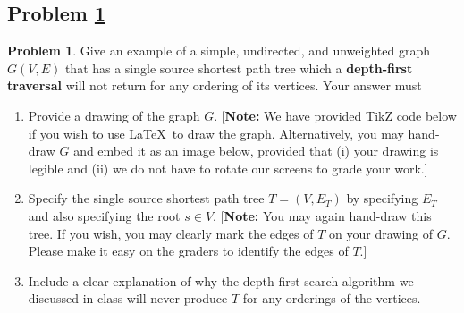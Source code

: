 \documentclass[11pt]{article}
\theoremstyle{definition}
\theoremstyle{definition}
\newtheorem{required}{Problem}
\theoremstyle{definition}
\begin{document}
\subsection{Problem \ref{DFS2}} 
\begin{required} \label{DFS2}
Give an example of a simple, undirected, and unweighted graph $G(V, E)$ that has a single source shortest path tree which a \textbf{depth-first traversal} will not return for any ordering of its vertices. 
    Your answer must
    \begin{enumerate}[label=(\alph*)]
    	\item Provide a drawing of the graph $G$. [\textbf{Note:} We have provided TikZ code below if you wish to use \LaTeX \ to draw the graph. Alternatively, you may hand-draw $G$ and embed it as an image below, provided that (i) your drawing is legible and (ii) we do not have to rotate our screens to grade your work.]
    	\item Specify the single source shortest path tree $T = (V,E_T)$ by specifying $E_T$ and also specifying the root $s \in V$. [\textbf{Note:} You may again hand-draw this tree. If you wish, you may clearly mark the edges of $T$ on your drawing of $G$. Please make it easy on the graders to identify the edges of $T$.] 
    	\item Include a clear explanation of why the depth-first search algorithm we discussed in class will never produce $T$ for any orderings of the vertices.
    \end{enumerate}

\end{required}
\end{document}
